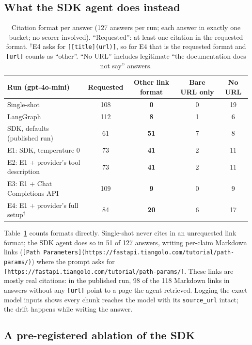 \documentclass[11pt]{article}
\newcommand{\code}[1]{\texttt{#1}}
\begin{document}
\subsection{What the SDK agent does instead}

\begin{table}[t]
\centering
\small
\begin{tabular}{lcccc}
\toprule
Run (gpt-4o-mini) & Requested & Other link format & Bare URL only & No URL \\
\midrule
Single-shot & 108 & \textbf{0} & 0 & 19 \\
LangGraph & 112 & \textbf{8} & 1 & 6 \\
SDK, defaults (published run) & 61 & \textbf{51} & 7 & 8 \\
\midrule
E1: SDK, temperature 0 & 73 & \textbf{41} & 2 & 11 \\
E2: E1 + provider's tool description & 73 & \textbf{41} & 2 & 11 \\
E3: E1 + Chat Completions API & 109 & \textbf{9} & 0 & 9 \\
E4: E1 + provider's full setup$^\dagger$ & 84 & \textbf{20} & 6 & 17 \\
\bottomrule
\end{tabular}
\caption{Citation format per answer (127 answers per run; each answer in exactly one bucket; no
scorer involved). ``Requested'': at least one citation in the requested format. $^\dagger$E4 asks
for \code{[[title](url)]}, so for E4 that is the requested format and \code{[url]} counts as
``other''. ``No URL'' includes legitimate ``the documentation does not say'' answers.}
\label{tab:format}
\end{table}

Table~\ref{tab:format} counts formats directly. Single-shot never cites in an unrequested link
format; the SDK agent does so in 51 of 127 answers, writing per-claim Markdown links
(\code{[Path Parameters](https://fastapi.tiangolo.com/tutorial/path-params/)}) where the prompt asks
for \code{[https://fastapi.tiangolo.com/tutorial/path-params/]}. These links are mostly real
citations: in the published run, 98 of the 118 Markdown links in answers without any
\code{[url]} point to a page the agent retrieved. Logging the exact model inputs shows every chunk
reaches the model with its \code{source\_url} intact; the drift happens while writing the answer.

\subsection{A pre-registered ablation of the SDK}
\label{sec:ablation}
\end{document}
